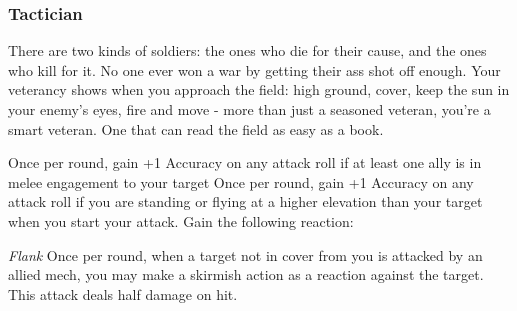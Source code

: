 \subsubsection{Tactician}

\begin{talent}
{There are two kinds of soldiers: the ones who die for their cause, and the ones who kill for it. No one ever won a war by getting their ass shot off enough. Your veterancy shows when you approach the field: high ground, cover, keep the sun in your enemy's eyes, fire and move - more than just a seasoned veteran, you're a smart veteran. One that can read the field as easy as a book.} 

Once per round, gain +1 Accuracy on any attack roll if at least one ally is in melee engagement to your target 
Once per round, gain +1 Accuracy on any attack roll if you are standing or flying at a higher elevation than your target when you start your attack. 
Gain the following reaction:

\textit{Flank}\newline
\Reaction\newline
Once per round, when a target not in cover from you is attacked by an allied mech, you may make a skirmish action as a reaction against the target. This attack deals half damage on hit.
\end{talent}